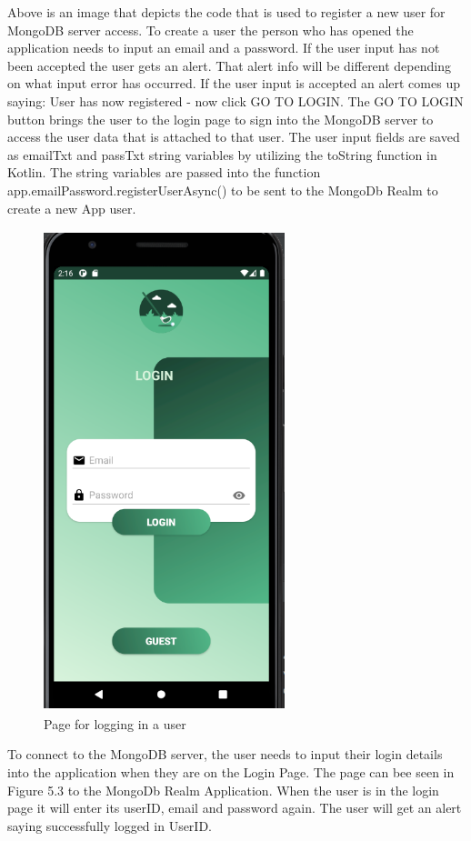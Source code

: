 Above is an image that depicts the code that is used to register a new user for MongoDB server access. To create a user the person who has opened the application needs to input an email and a password. If the user input has not been accepted the user gets an alert. That alert info will be different depending on what input error has occurred. If the user input is accepted an alert comes up saying: User has now registered - now click GO TO LOGIN. The GO TO LOGIN button brings the user to the login page to sign into the MongoDB server to access the user data that is attached to that user.
\newline
The user input fields are saved as emailTxt and passTxt string variables by utilizing the toString function in Kotlin. The string variables are passed into the function app.emailPassword.registerUserAsync() to be sent to the MongoDb Realm to create a new App user.
\begin{figure}[H]
    \centering
    \includegraphics[width=7cm, height = 14cm]{img/loginPage.PNG}
    \caption{Page for logging in a user}
    \label{fig:altas config}
\end{figure}
To connect to the MongoDB server, the user needs to input their login details into the application when they are on the Login Page. The page can bee seen in Figure 5.3 to the MongoDb Realm Application. When the user is in the login page it will enter its userID, email and password again. The user will get an alert saying successfully logged in UserID.


